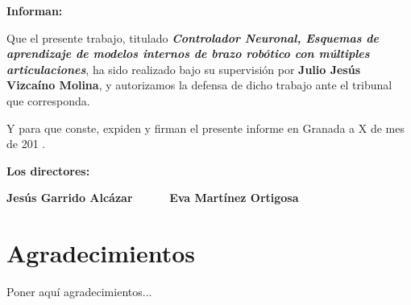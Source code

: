 \textbf{Informan:}

\vspace{0.5cm}

Que el presente trabajo, titulado \textit{\textbf{Controlador Neuronal, Esquemas de aprendizaje de modelos internos de brazo robótico con múltiples articulaciones}}, ha sido realizado bajo su supervisión por \textbf{Julio Jesús Vizcaíno Molina}, y autorizamos la defensa de dicho trabajo ante el tribunal que corresponda.

\vspace{0.5cm}

Y para que conste, expiden y firman el presente informe en Granada a X de mes de 201 .

\vspace{1cm}

\textbf{Los directores:}

\vspace{5cm}

\noindent \textbf{Jesús Garrido Alcázar \ \ \ \ \ Eva Martínez Ortigosa}

\chapter*{Agradecimientos}
\thispagestyle{empty}

       \vspace{1cm}


Poner aquí agradecimientos...

